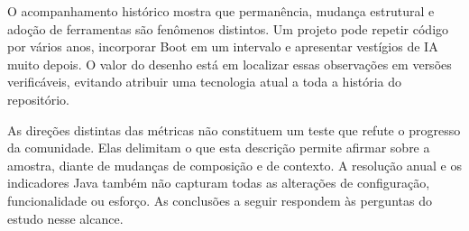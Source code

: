 O acompanhamento histórico mostra que permanência, mudança estrutural e adoção de ferramentas são fenômenos distintos. Um projeto pode repetir código por vários anos, incorporar Boot em um intervalo e apresentar vestígios de IA muito depois. O valor do desenho está em localizar essas observações em versões verificáveis, evitando atribuir uma tecnologia atual a toda a história do repositório.

As direções distintas das métricas não constituem um teste que refute o progresso da comunidade. Elas delimitam o que esta descrição permite afirmar sobre a amostra, diante de mudanças de composição e de contexto. A resolução anual e os indicadores Java também não capturam todas as alterações de configuração, funcionalidade ou esforço. As conclusões a seguir respondem às perguntas do estudo nesse alcance.
